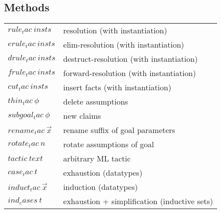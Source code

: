 \subsection{Methods}

\begin{tabular}{ll}
  $rule_tac~insts$ & resolution (with instantiation) \\
  $erule_tac~insts$ & elim-resolution (with instantiation) \\
  $drule_tac~insts$ & destruct-resolution (with instantiation) \\
  $frule_tac~insts$ & forward-resolution (with instantiation) \\
  $cut_tac~insts$ & insert facts (with instantiation) \\
  $thin_tac~\phi$ & delete assumptions \\
  $subgoal_tac~\phi$ & new claims \\
  $rename_tac~\vec x$ & rename suffix of goal parameters \\
  $rotate_tac~n$ & rotate assumptions of goal \\
  $tactic~text$ & arbitrary ML tactic \\
  $case_tac~t$ & exhaustion (datatypes) \\
  $induct_tac~\vec x$ & induction (datatypes) \\
  $ind_cases~t$ & exhaustion + simplification (inductive sets) \\
\end{tabular}


